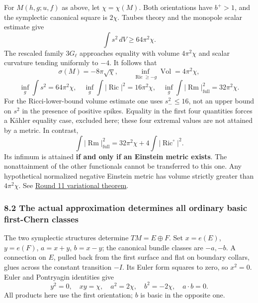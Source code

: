 \documentclass[
  english,
]{article}
\begin{document}
For \(M(h,g;u,f)\) as above, let \(\chi=\chi(M)\). Both orientations
have \(b^+>1\), and the symplectic canonical square is \(2\chi\). Taubes
theory and the monopole scalar estimate give \[
 \int s^2\,dV\ge64\pi^2\chi.
\] The rescaled family \(3G_\ell\) approaches equality with volume
\(4\pi^2\chi\) and scalar curvature tending uniformly to \(-4\). It
follows that \[
 \sigma(M)=-8\pi\sqrt\chi,\qquad
 \inf_{\operatorname{Ric}\ge-g}\operatorname{Vol}=4\pi^2\chi,
\] \[
 \inf_g\int s^2=64\pi^2\chi,\quad
 \inf_g\int|\operatorname{Ric}|^2=16\pi^2\chi,\quad
 \inf_g\int|\operatorname{Rm}|_{\mathrm{full}}^2=32\pi^2\chi.
\] For the Ricci-lower-bound volume estimate one uses \(s_-^2\le16\),
not an upper bound on \(s^2\) in the presence of positive spikes.
Equality in the first four quantities forces a Kähler equality case,
excluded here; these four extremal values are not attained by a metric.
In contrast, \[
 \int|\operatorname{Rm}|_{\mathrm{full}}^2
 =32\pi^2\chi+4\int|\operatorname{Ric}^{\circ}|^2.
\] Its infimum is attained \textbf{if and only if an Einstein metric
exists}. The nonattainment of the other functionals cannot be
transferred to this one. Any hypothetical normalized negative Einstein
metric has volume strictly greater than \(4\pi^2\chi\). See
\href{../proofs/round11_variational.md}{Round 11 variational theorem}.

\hypertarget{the-actual-approximation-determines-all-ordinary-basic-first-chern-classes}{%
\subsubsection{8.2 The actual approximation determines all ordinary
basic first-Chern
classes}\label{the-actual-approximation-determines-all-ordinary-basic-first-chern-classes}}

The two symplectic structures determine \(TM=E\oplus F\). Set
\(x=e(E)\), \(y=e(F)\), \(a=x+y\), \(b=x-y\); the canonical bundle
classes are \(-a,-b\). A connection on \(E\), pulled back from the first
surface and flat on boundary collars, glues across the constant
transition \(-I\). Its Euler form squares to zero, so \(x^2=0\). Euler
and Pontryagin identities give \[
 y^2=0,\quad xy=\chi,\quad a^2=2\chi,\quad b^2=-2\chi,\quad a\cdot b=0.
\] All products here use the first orientation; \(b\) is basic in the
opposite one.
\end{document}
